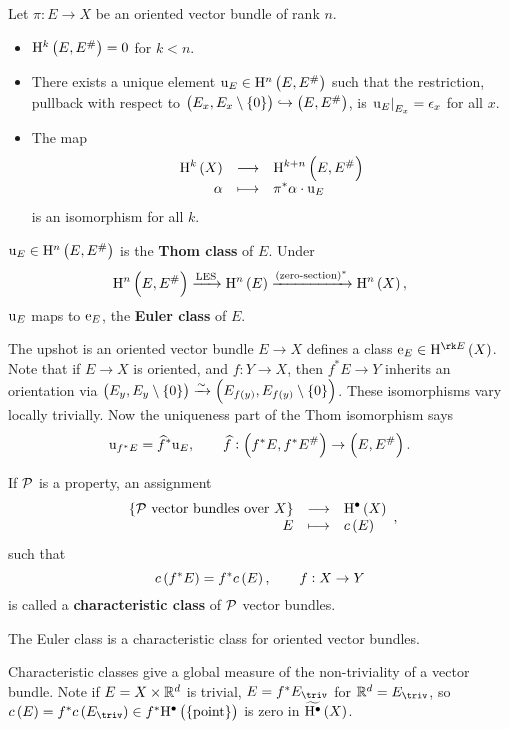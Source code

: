 \begin{theorem}
\label{thm:thomisomorphism}
Let $ \pi : E \to X $ be an oriented vector bundle of rank $ n $.
\begin{itemize}
\item $ \H^k\br{E, E^\#} = 0 $ for $ k < n $.
\item There exists a unique element $ \u_E \in \H^n\br{E, E^\#} $ such that the restriction, pullback with respect to $ \br{E_x, E_x \setminus \cbr{0}} \hookrightarrow \br{E, E^\#} $, is $ \left. \mathrm{u}_E \right|_{E_x} = \epsilon_x $ for all $ x $.
\item The map
$$ \function{\H^k\br{X}}{\H^{k + n}\br{E, E^\#}}{\alpha}{\pi^*\alpha \cdot \u_E} $$
is an isomorphism for all $ k $.
\end{itemize}
\end{theorem}

\begin{definition*}
$ \u_E \in \H^n\br{E, E^\#} $ is the \textbf{Thom class} of $ E $. Under
$$ \H^n\br{E, E^\#} \xrightarrow{\text{LES}} \H^n\br{E} \xrightarrow{\br{\text{zero-section}}^*} \H^n\br{X}, $$
$ \mathrm{u}_E $ maps to $ \mathrm{e}_E $, the \textbf{Euler class} of $ E $.
\end{definition*}

The upshot is an oriented vector bundle $ E \to X $ defines a class $ \e_E \in \H^{\rk E}\br{X} $. Note that if $ E \to X $ is oriented, and $ f : Y \to X $, then $ f^*E \to Y $ inherits an orientation via $ \br{E_y, E_y \setminus \cbr{0}} \xrightarrow{\sim} \br{E_{f\br{y}}, E_{f\br{y}} \setminus \cbr{0}} $. These isomorphisms vary locally trivially. Now the uniqueness part of the Thom isomorphism says
$$ \u_{f^*E} = \widehat{f}^*\u_E, \qquad \widehat{f} : \br{f^*E, f^*E^\#} \to \br{E, E^\#}. $$

\pagebreak

\begin{definition*}
If $ \mathcal{P} $ is a property, an assignment
$$ \function{\cbr{\PPP \ \text{vector bundles over} \ X}}{\H^\bullet\br{X}}{E}{c\br{E}}, $$
such that
$$ c\br{f^*E} = f^*c\br{E}, \qquad f : X \to Y $$
is called a \textbf{characteristic class} of $ \mathcal{P} $ vector bundles.
\end{definition*}

\begin{example*}
The Euler class is a characteristic class for oriented vector bundles.
\end{example*}

Characteristic classes give a global measure of the non-triviality of a vector bundle. Note if $ E = X \times \mathbb{R}^d $ is trivial, $ E = f^*E_{\triv} $ for $ \RR^d = E_{\triv} $, so $ c\br{E} = f^*c\br{E_{\triv}} \in f^*\H^\bullet\br{\pt} $ is zero in $ \widetilde{\H^\bullet}\br{X} $.

